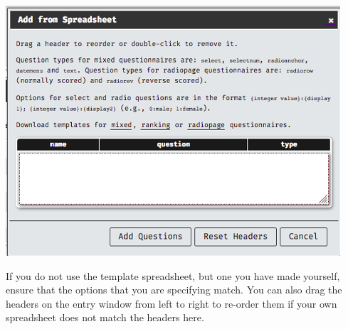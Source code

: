 \documentclass[]{book}
\begin{document}
\includegraphics{images/screenshots/quest_spread_3.png}

If you do not use the template spreadsheet, but one you have made
yourself, ensure that the options that you are specifying match. You can
also drag the headers on the entry window from left to right to re-order
them if your own spreadsheet does not match the headers here.
\end{document}
